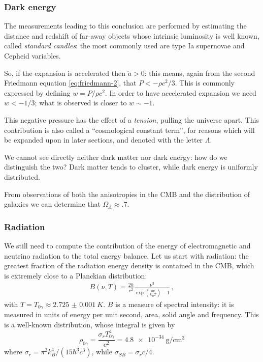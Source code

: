 \documentclass[main.tex]{subfiles}
\begin{document}
\subsubsection{Dark energy}

The measurements leading to this conclusion are performed by estimating the distance and redshift of far-away objects whose intrinsic luminosity is well known, called \emph{standard candles}: the most commonly used are type Ia supernovae and Cepheid variables.

So, if the expansion is accelerated then \(\ddot{a} > 0\): this means, again from the second Friedmann equation \eqref{eq:friedmann-2}, that \(P < -\rho c^2/3\).
This is commonly expressed by defining \(w = P / \rho c^2\). 
In order to have accelerated expansion we need \(w < -1/3\); what is observed is closer to \(w \sim -1\).

This negative pressure has the effect of a \emph{tension}, pulling the universe apart.
This contribution is also called a ``cosmological constant term'', for reasons which will be expanded upon in later sections, and denoted with the letter \(\Lambda \).

We cannot see directly neither dark matter nor dark energy: how do we distinguish the two? Dark matter tends to cluster, while dark energy is uniformly distributed.

From observations of both the anisotropies in the CMB and the distribution of galaxies we can determine that \(\Omega_{\Lambda } \approx \num{.7}\).


\subsubsection{Radiation}

We still need to compute the contribution of the energy of electromagnetic and neutrino radiation to the total energy balance.
Let us start with radiation: the greatest fraction of the radiation energy density is contained in the CMB, which is extremely close to a Planckian distribution: 
%
\begin{align}
B (\nu, T) = \frac{2 h}{c^2} \frac{\nu^3}{\exp(\frac{h \nu }{k_B T}) - 1}
\,,
\end{align}
%
with \(T = T_{0 \gamma } \approx \SI{2.725(1)}{K}\). \(B\) is a measure of spectral intensity: it is measured in units of energy per unit second, area, solid angle and frequency. This is a well-known distribution, whose integral is given by
%
\begin{equation}
  \rho_{0 \gamma} = \frac{\sigma_r T_{0 \gamma}^4}{c^2} = \SI{4.8e-34}{\gram\per\centi\metre\cubed}
\end{equation}
%
where \(\sigma_r = \pi^2 k_B^4 / (15 \hbar ^3 c^3)\), while \(\sigma_{SB} = \sigma_r c /4\).
\end{document}
